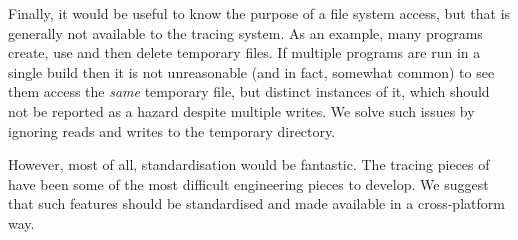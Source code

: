 Finally, it would be useful to know the purpose of a file system access, but that is generally not available to the tracing system. As an example, many programs create, use and then delete temporary files. If multiple programs are run in a single \Rattle build then it is not unreasonable (and in fact, somewhat common) to see them access the \emph{same} temporary file, but distinct instances of it, which should not be reported as a hazard despite multiple writes. We solve such issues by ignoring reads and writes to the temporary directory.

However, most of all, standardisation would be fantastic. The tracing pieces of \Rattle have been some of the most difficult engineering pieces to develop. We suggest that such features should be standardised and made available in a cross-platform way.
